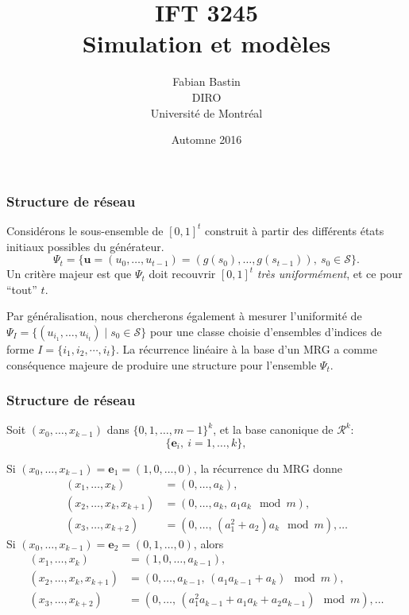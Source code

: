 \documentclass[t,usepdftitle=false]{beamer}
\title[IFT3245]{IFT 3245\\Simulation et modèles}
\author[Fabian Bastin]{Fabian Bastin\\DIRO\\Université de Montréal}
\date{Automne 2016}
\def\be{\boldsymbol{e}}
\def\cS{\mathcal{S}}
\def\rit{\mathcal{R}}
\begin{document}
\frame{\titlepage}


\begin{frame}
\frametitle{Structure de réseau}

Considérons le sous-ensemble de $[0,1]^t$ construit à partir des différents états initiaux possibles du générateur.
\[
{\Psi_t} = \{\boldsymbol{u} = (u_0,\dots,u_{t-1})
   = (g(s_0),\dots,g(s_{t-1})),\ s_0 \in\cS \}.
\]
Un critère majeur est que $\Psi_t$ doit recouvrir $[0,1]^t$ 
\emph{très uniformément}, et ce pour ``tout'' $t$.

\mbox{}

Par généralisation, nous chercherons également à mesurer l'uniformité de ${\Psi_I} = \{ (u_{i_1},\dots,u_{i_t}) \mid s_0 \in \cS\}$ pour une classe choisie d'ensembles d'indices de forme  ${I} = \{i_1, i_2, \cdots, i_t\}$.
La récurrence linéaire à la base d'un MRG a comme conséquence majeure de produire une
structure pour l'ensemble $\Psi_t$.

\end{frame}

\begin{frame}
\frametitle{Structure de réseau}

Soit $(x_0,\dots,x_{k-1})$ dans $\{0,1,\dots,m-1\}^k$, et la base canonique de $\rit^k$:
\[
 \lbrace \be_i,\ i = 1,\ldots,k \rbrace,
\]

\mbox{}

Si {$(x_0,\dots,x_{k-1}) = \be_1 = (1,0,\dots,0)$}, la récurrence du MRG donne
\begin{align*}
(x_1,\dots,x_k) &= (0,\dots,a_k), \\ 
(x_2,\dots,x_k, x_{k+1}) &= (0,\dots, a_k,\, a_1 a_k \mod m), \\
(x_3,\dots,x_{k+2}) &= (0,\dots,\, (a_1^2 + a_2) a_k \mod m), \dots
\end{align*}
Si {$(x_0,\dots,x_{k-1}) = \be_2 = (0,1,\dots,0)$}, \hbox{} alors
\begin{align*}
(x_1,\dots,x_k) &= (1,0,\dots, a_{k-1}), \\ 
(x_2,\dots,x_k, x_{k+1}) &= (0,\dots, a_{k-1},\, (a_1 a_{k-1} + a_k) \mod m), \\ 
 (x_3,\dots,x_{k+2}) &= (0,\dots,\,(a_1^2 a_{k-1} + a_1 a_k + a_2 a_{k-1}) \mod m), 
 \dots
\end{align*}

\end{frame}
\end{document}
